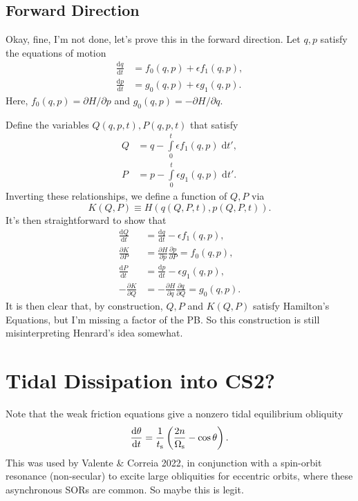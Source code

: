 \documentclass[12pt]{article}
\newcommand*{\rd}[2]{\frac{\mathrm{d}#1}{\mathrm{d}#2}}
\newcommand*{\pd}[2]{\frac{\partial#1}{\partial#2}}
\newcommand*{\pdil}[2]{\partial#1 / \partial#2}
\newcommand*{\p}[1]{\left(#1\right)}
\begin{document}
\subsection{Forward Direction}

Okay, fine, I'm not done, let's prove this in the forward direction. Let $q, p$
satisfy the equations of motion
\begin{align}
    \rd{q}{t} &= f_0(q, p) + \epsilon f_1(q, p),\\
    \rd{p}{t} &= g_0(q, p) + \epsilon g_1(q, p).
\end{align}
Here, $f_0(q, p) = \pdil{H}{p}$ and $g_0(q, p) = -\pdil{H}{q}$.

Define the variables $Q(q, p, t), P(q, p, t)$ that satisfy
\begin{align}
    Q &= q - \int\limits_0^t \epsilon f_1(q, p)\;\mathrm{d}t',\\
    P &= p - \int\limits_0^t \epsilon g_1(q, p)\;\mathrm{d}t'.
\end{align}
Inverting these relationships, we define a function of $Q, P$ via
\begin{equation}
    K(Q, P) \equiv H(q(Q, P, t), p(Q, P, t)).
\end{equation}
It's then straightforward to show that
\begin{align}
    \rd{Q}{t} &= \rd{q}{t} - \epsilon f_1(q, p),\\
    \pd{K}{P} &= \pd{H}{p}\pd{p}{P} = f_0(q, p),\\
    \rd{P}{t} &= \rd{p}{t} - \epsilon g_1(q, p),\\
    -\pd{K}{Q} &= -\pd{H}{q}\pd{q}{Q} = g_0(q, p).
\end{align}
It is then clear that, by construction, $Q, P$ and $K(Q, P)$ satisfy Hamilton's
Equations, but I'm missing a factor of the PB\@. So this construction is still
misinterpreting Henrard's idea somewhat.

\section{Tidal Dissipation into CS2?}

Note that the weak friction equations give a nonzero tidal equilibrium obliquity
\begin{equation}
    \rd{\theta}{t} = \frac{1}{t_{\rm s}}
        \p{\frac{2n}{\Omega_{\rm s}} - \cos \theta}.
\end{equation}
This was used by Valente \& Correia 2022, in conjunction with a spin-orbit
resonance (non-secular) to excite large obliquities for eccentric orbits, where
these asynchronous SORs are common. So maybe this is legit.
\end{document}
